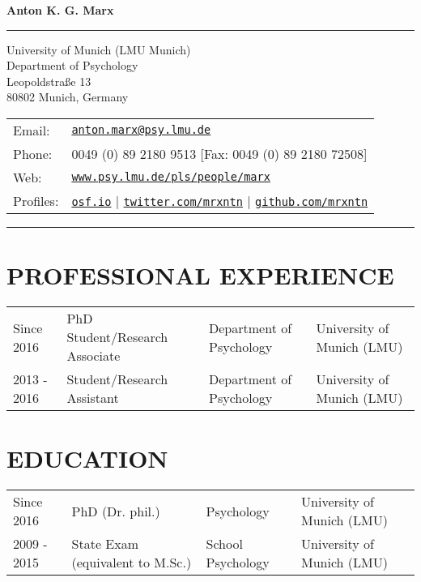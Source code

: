 \documentclass[letterpaper]{article}
\def\name{Anton K. G. Marx} %
\begin{document}
{\Huge \bf \name}

\vspace{0.1in}

\noindent\rule{\textwidth}{0.5pt} %

\vspace{0.1in}

\begin{minipage}{0.45\linewidth}
  University of Munich (LMU Munich) \\
  Department of Psychology \\
  Leopoldstraße 13 \\ 
  80802 Munich, Germany
\end{minipage}
\begin{minipage}{1.45\linewidth}
  \begin{tabular}{ll}
    Email: & \href{mailto:anton.marx@psy.lmu.de}{\tt anton.marx@psy.lmu.de} \\
    Phone: & 0049 (0) 89  2180 9513 [Fax: 0049 (0) 89 2180 72508]\\
    Web: & \href{https://www.psy.lmu.de/pls/people/marx/}{\tt www.psy.lmu.de/pls/people/marx} \\
    Profiles: & \href{https://www.osf.io/z7rfu/}{\tt osf.io} | \href{https://www.twitter.com/mrxntn/}{\tt twitter.com/mrxntn} | \href{https://www.github.com/mrxntn/}{\tt github.com/mrxntn}
      \end{tabular}
\end{minipage}

\vspace{0.1in}

\noindent\rule{\textwidth}{0.5pt} %


\section*{PROFESSIONAL EXPERIENCE}
  \begin{tabular}{llll}
    Since 2016 & PhD Student/Research Associate & Department of Psychology & University of Munich (LMU)\\
    2013 - 2016 & Student/Research Assistant & Department of Psychology & University of Munich (LMU)\\
      \end{tabular}

\section*{EDUCATION}
  \begin{tabular}{llll}
    Since 2016 & PhD (Dr. phil.) & Psychology & University of Munich (LMU)\\
    2009 - 2015 & State Exam (equivalent to M.Sc.) & School Psychology & University of Munich (LMU)\\
      \end{tabular}
\end{document}
